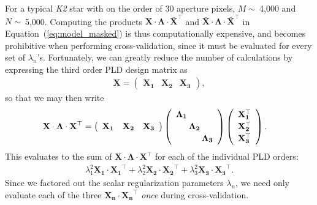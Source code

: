 \documentclass[]{emulateapj}
\begin{document}
For a typical \emph{K2} star with on the order of 30 aperture pixels, $M \sim\ $4,000 and
$N \sim\ $5,000. Computing the products $\mathbf{X} \cdot \mathbf{\Lambda} \cdot \mathbf{\bar{X}}^\top$
and $\mathbf{\bar{X}} \cdot \mathbf{\Lambda} \cdot \mathbf{\bar{X}}^\top$ in Equation~(\ref{eq:model_masked})
is thus computationally expensive, and becomes prohibitive when performing cross-validation,
since it must be evaluated for every set of $\lambda_{n}$'s. Fortunately, we can greatly reduce 
the number of calculations by expressing the third order PLD design matrix as
%
\begin{align}
\label{eq:design_simple}
\mathbf{X} = 
\left(
\begin{array}{ccc}
  \mathbf{X_1} & \mathbf{X_2} & \mathbf{X_3}
\end{array}
\right),
\end{align}
%
so that we may then write
%
\begin{align}
\label{eq:separable1}
\mathbf{X} \cdot \mathbf{\Lambda} \cdot \mathbf{X}^\top &= 
%
\left(
\begin{array}{ccc}
  \mathbf{X_1} & \mathbf{X_2} & \mathbf{X_3}
\end{array}
\right)
%
\left(
\begin{array}{ccc}
  \mathbf{\Lambda_1}\hspace*{-8pt}      &                                     & \\[2pt]
  &                                     \mathbf{\Lambda_2}\hspace*{-8pt}      & \\[2pt]
  &                                     &                                     \mathbf{\Lambda_3} \\
\end{array}
\right)
%
\left(
\begin{array}{c}
  \mathbf{X_1^\top} \\[2pt]
  \mathbf{X_2^\top} \\[2pt]
  \mathbf{X_3^\top} \\
\end{array}
\right).\nonumber
\end{align}
%
This evaluates to the sum of $\mathbf{X} \cdot \mathbf{\Lambda} \cdot \mathbf{X}^\top$
for each of the individual PLD orders:
%
\begin{align}
\lambda_1^2 \mathbf{X_1} \cdot \mathbf{X_1}^\top +
\lambda_2^2 \mathbf{X_2} \cdot \mathbf{X_2}^\top +
\lambda_3^2 \mathbf{X_3} \cdot \mathbf{X_3}^\top.
\end{align}
%
Since we factored out the scalar regularization parameters $\lambda_n$, we need only evaluate each 
of the three $\mathbf{X_n} \cdot \mathbf{X_n}^\top$ \emph{once} during cross-validation.
\end{document}
